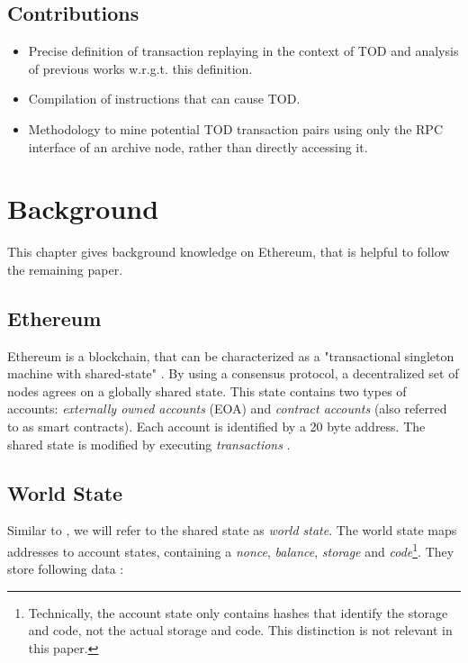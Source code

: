 \documentclass[draft,final]{vutinfth} %
\begin{document}
\section{Contributions}

\begin{itemize}
    \item Precise definition of transaction replaying in the context of TOD and analysis of previous works w.r.g.t. this definition.
    \item Compilation of instructions that can cause TOD.
    \item Methodology to mine potential TOD transaction pairs using only the RPC interface of an archive node, rather than directly accessing it.
\end{itemize}

\chapter{Background}

This chapter gives background knowledge on Ethereum, that is helpful to follow the remaining paper.

\section{Ethereum}

Ethereum is a blockchain, that can be characterized as a "transactional singleton machine with shared-state" \cite{wood_ethereum_2024}. By using a consensus protocol, a decentralized set of nodes agrees on a globally shared state. This state contains two types of accounts: \emph{externally owned accounts} (EOA) and \emph{contract accounts} (also referred to as smart contracts). Each account is identified by a 20 byte address. The shared state is modified by executing \emph{transactions} \cite{tikhomirov_ethereum_2018}.

\section{World State}

Similar to \cite{wood_ethereum_2024}, we will refer to the shared state as \emph{world state}. The world state maps addresses to account states, containing a \emph{nonce}, \emph{balance}, \emph{storage} and \emph{code}\footnote{Technically, the account state only contains hashes that identify the storage and code, not the actual storage and code. This distinction is not relevant in this paper.}. They store following data \cite{wood_ethereum_2024}:
\end{document}
